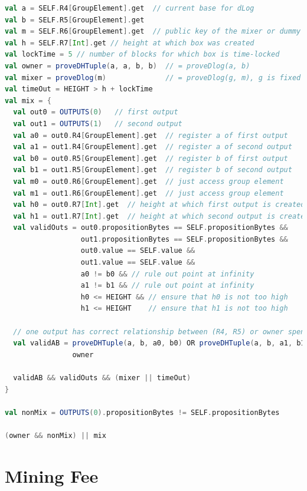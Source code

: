 \documentclass[runningheads]{llncs}
\begin{document}
\begin{lstlisting}[language=Scala,caption={Mix-script with Stealth Transfers},label=stealthTransfer]
val a = SELF.R4[GroupElement].get  // current base for dLog
val b = SELF.R5[GroupElement].get
val m = SELF.R6[GroupElement].get  // public key of the mixer or dummy value
val h = SELF.R7[Int].get // height at which box was created
val lockTime = 5 // number of blocks for which box is time-locked
val owner = proveDHTuple(a, a, b, b)  // = proveDlog(a, b)
val mixer = proveDlog(m)              // = proveDlog(g, m), g is fixed
val timeOut = HEIGHT > h + lockTime
val mix = {
  val out0 = OUTPUTS(0)   // first output
  val out1 = OUTPUTS(1)   // second output
  val a0 = out0.R4[GroupElement].get  // register a of first output
  val a1 = out1.R4[GroupElement].get  // register a of second output
  val b0 = out0.R5[GroupElement].get  // register b of first output
  val b1 = out1.R5[GroupElement].get  // register b of second output
  val m0 = out0.R6[GroupElement].get  // just access group element 
  val m1 = out1.R6[GroupElement].get  // just access group element 
  val h0 = out0.R7[Int].get  // height at which first output is created 
  val h1 = out1.R7[Int].get  // height at which second output is created  
  val validOuts = out0.propositionBytes == SELF.propositionBytes &&
                  out1.propositionBytes == SELF.propositionBytes &&
                  out0.value == SELF.value && 
                  out1.value == SELF.value &&
                  a0 != b0 && // rule out point at infinity
                  a1 != b1 && // rule out point at infinity        
                  h0 <= HEIGHT && // ensure that h0 is not too high
                  h1 <= HEIGHT    // ensure that h1 is not too high
      
  // one output has correct relationship between (R4, R5) or owner spends
  val validAB = proveDHTuple(a, b, a0, b0) OR proveDHTuple(a, b, a1, b1) OR
                owner
  
  validAB && validOuts && (mixer || timeOut)
}

val nonMix = OUTPUTS(0).propositionBytes != SELF.propositionBytes

(owner && nonMix) || mix
\end{lstlisting}

\section{Mining Fee}
\end{document}
